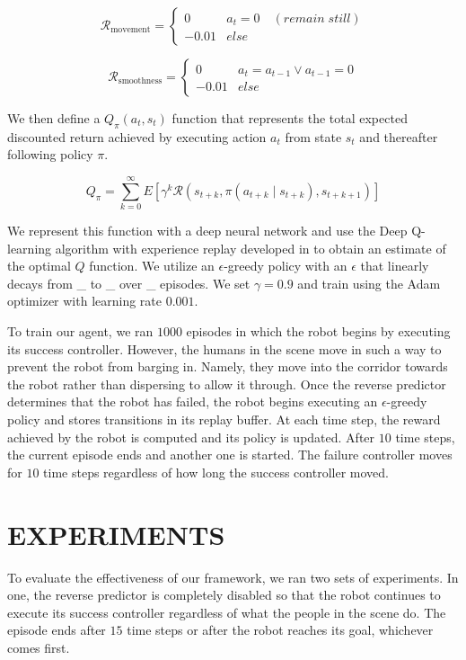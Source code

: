 \documentclass[letterpaper, 10 pt, conference]{ieeeconf}  %
\begin{document}
		\begin{equation}\label{eq:rmovement}
			\mathcal{R}_{\text{movement}} = \begin{cases}
			0       &   a_t = 0 \quad(remain\;still)\\
			-0.01   &   else
			\end{cases}
		\end{equation}
		
		\begin{equation}\label{eq:rsmoothness}
			\mathcal{R}_{\text{smoothness}} = \begin{cases}
			0       &   a_t = a_{t-1} \vee a_{t-1} = 0\\
			-0.01   &   else
			\end{cases}
		\end{equation}
		
		We then define a $Q_{\pi}(a_t, s_t)$ function that represents the total expected discounted return achieved by executing action $a_t$ from state $s_t$ and thereafter following policy $\pi$. 
		
		\begin{equation}\label{eq:q}
			Q_{\pi} = 
			\sum_{k=0}^{\infty}E[\gamma^k \mathcal{R}(s_{t+k}, \pi(a_{t+k} \mid s_{t+k}), s_{t+k+1})]
		\end{equation}
		
		We represent this function with a deep neural network and use the Deep Q-learning algorithm with experience replay developed in \cite{dqn} to obtain an estimate of the optimal $Q$ function. We utilize an $\epsilon$-greedy policy with an $\epsilon$ that linearly decays from \_ to \_ over \_ episodes. We set $\gamma=0.9$ and train using the Adam optimizer with learning rate $0.001$. 
		
		To train our agent, we ran $1000$ episodes in which the robot begins by executing its success controller. However, the humans in the scene move in such a way to prevent the robot from barging in. Namely, they move into the corridor towards the robot rather than dispersing to allow it through. Once the reverse predictor determines that the robot has failed, the robot begins executing an $\epsilon$-greedy policy and stores transitions in its replay buffer. At each time step, the reward achieved by the robot is computed and its policy is updated. After $10$ time steps, the current episode ends and another one is started. The failure controller moves for $10$ time steps regardless of how long the success controller moved. 
		
\section{EXPERIMENTS}
	To evaluate the effectiveness of our framework, we ran two sets of experiments. In one, the reverse predictor is completely disabled so that the robot continues to execute its success controller regardless of what the people in the scene do. The episode ends after $15$ time steps or after the robot reaches its goal, whichever comes first.
	
\end{document}
